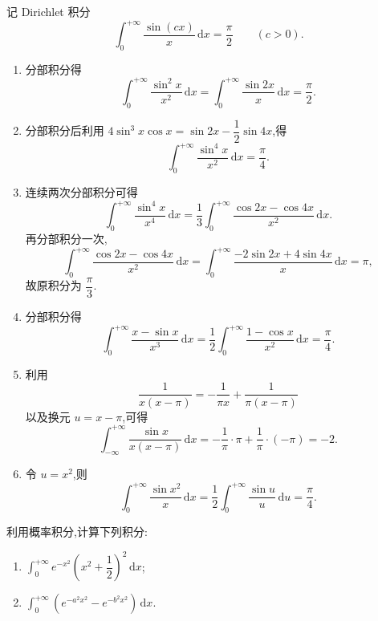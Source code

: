 \begin{solution}
  记 Dirichlet 积分
  \[
    \int_0^{+\infty}\dfrac{\sin(cx)}{x}\,\mathrm{d}x=\dfrac{\pi}{2}
    \qquad(c>0).
  \]
  \begin{enumerate}
    \item 分部积分得
          \[
            \int_0^{+\infty}\dfrac{\sin^2x}{x^2}\,\mathrm{d}x
            =\int_0^{+\infty}\dfrac{\sin2x}{x}\,\mathrm{d}x=\dfrac{\pi}{2}.
          \]
    \item 分部积分后利用
          $4\sin^3x\cos x=\sin2x-\dfrac{1}{2}\sin4x$,得
          \[
            \int_0^{+\infty}\dfrac{\sin^4x}{x^2}\,\mathrm{d}x
            =\dfrac{\pi}{4}.
          \]
    \item 连续两次分部积分可得
          \[
            \int_0^{+\infty}\dfrac{\sin^4x}{x^4}\,\mathrm{d}x
            =\dfrac{1}{3}\int_0^{+\infty}\dfrac{\cos2x-\cos4x}{x^2}\,\mathrm{d}x.
          \]
          再分部积分一次,
          \[
            \int_0^{+\infty}\dfrac{\cos2x-\cos4x}{x^2}\,\mathrm{d}x
            =\int_0^{+\infty}\dfrac{-2\sin2x+4\sin4x}{x}\,\mathrm{d}x=\pi,
          \]
          故原积分为 $\dfrac{\pi}{3}$.
    \item 分部积分得
          \[
            \int_0^{+\infty}\dfrac{x-\sin x}{x^3}\,\mathrm{d}x
            =\dfrac{1}{2}\int_0^{+\infty}\dfrac{1-\cos x}{x^2}\,\mathrm{d}x
            =\dfrac{\pi}{4}.
          \]
    \item 利用
          \[
            \dfrac{1}{x(x-\pi)}=-\dfrac{1}{\pi x}+\dfrac{1}{\pi(x-\pi)}
          \]
          以及换元 $u=x-\pi$,可得
          \[
            \int_{-\infty}^{+\infty}\dfrac{\sin x}{x(x-\pi)}\,\mathrm{d}x
            =-\dfrac{1}{\pi}\cdot\pi+\dfrac{1}{\pi}\cdot(-\pi)=-2.
          \]
    \item 令 $u=x^2$,则
          \[
            \int_0^{+\infty}\dfrac{\sin x^2}{x}\,\mathrm{d}x
            =\dfrac{1}{2}\int_0^{+\infty}\dfrac{\sin u}{u}\,\mathrm{d}u
            =\dfrac{\pi}{4}.
          \]
  \end{enumerate}
\end{solution}

\begin{example}
  利用概率积分,计算下列积分:
  \begin{enumerate}
    \item $\displaystyle\int_0^{+\infty}e^{-x^2}\left(x^2+\dfrac{1}{2}\right)^2\,\mathrm{d}x$;
    \item $\displaystyle\int_0^{+\infty}\left(e^{-a^2x^2}-e^{-b^2x^2}\right)\,\mathrm{d}x$.
  \end{enumerate}
\end{example}
\exampleblank

